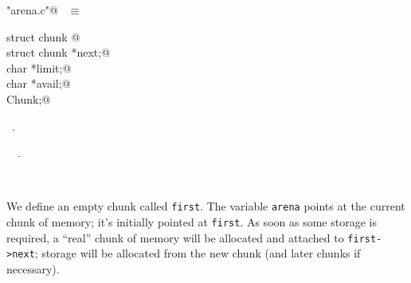 \documentclass{report}
\begin{document}
\begin{flushleft} \small
\begin{minipage}{\linewidth} \label{scrap256}
\verb@"arena.c"@\nobreak\ {\footnotesize {} }$\equiv$
\vspace{-1ex}
\begin{list}{}{} \item
\mbox{}\verb@typedef struct chunk {@\\
\mbox{}\verb@  struct chunk *next;@\\
\mbox{}\verb@  char *limit;@\\
\mbox{}\verb@  char *avail;@\\
\mbox{}\verb@} Chunk;@\\
\mbox{}\verb@@{\NWsep}
\end{list}
\vspace{-1ex}
\footnotesize\addtolength{\baselineskip}{-1ex}
\begin{list}{}{\setlength{\itemsep}{-\parsep}\setlength{\itemindent}{-\leftmargin}}
\item \NWtxtFileDefBy\ .
\end{list}
\vspace{-2ex}
\footnotesize\addtolength{\baselineskip}{-1ex}
\begin{list}{}{\setlength{\itemsep}{-\parsep}\setlength{\itemindent}{-\leftmargin}}
\item \NWtxtIdentsDefed\nobreak\  \verb@Chunk@\nobreak\ .\end{list}
\end{minipage}\\[4ex]
\end{flushleft}
We define an empty chunk called \verb|first|. The variable \verb|arena| points
at the current chunk of memory; it's initially pointed at \verb|first|.
As soon as some storage is required, a ``real'' chunk of memory will
be allocated and attached to \verb|first->next|; storage will be
allocated from the new chunk (and later chunks if necessary).
\end{document}
